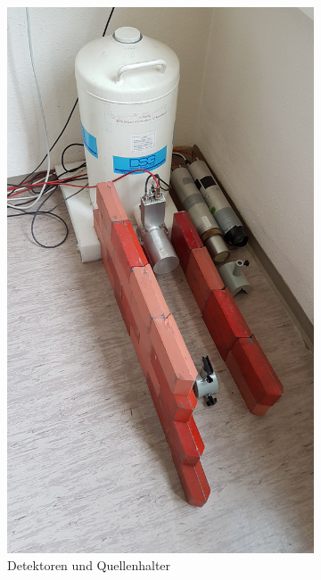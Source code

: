 	\begin{figure}[htb]
		\begin{subfigure}[b]{0.5\textwidth}
			\centering
			\includegraphics[scale=0.1, angle=-90]{pic/20160613_152508.jpg}
			\caption{Detektoren und Quellenhalter}
		\end{subfigure}
		\begin{subfigure}[b]{0.5\textwidth}
			\centering

\end{subfigure}
\end{figure}
